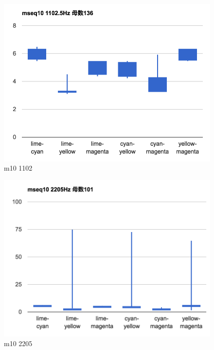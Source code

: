 \begin{figure}[p]
  \centering
  \includegraphics[clip,width=1.05\hsize]{img/m10_1102.png}
  \caption{m10 1102}\label{fig:m10Z1102}
\end{figure}

\begin{figure}[p]
  \centering
  \includegraphics[clip,width=1.05\hsize]{img/m10_2205.png}
  \caption{m10 2205}\label{fig:m10Z2205}
\end{figure}

